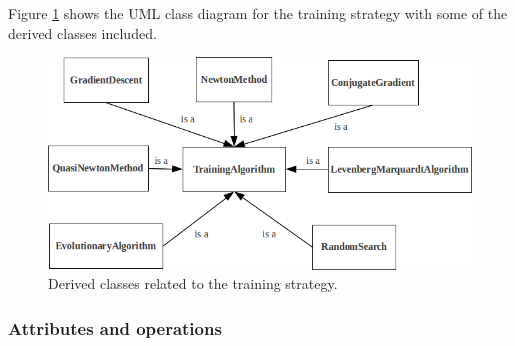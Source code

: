 Figure \ref{TrainingStrategyDerivedClassDiagram} shows the UML class diagram for the training strategy with some of the derived classes included.

\begin{figure}[h!]
\includegraphics[width=1.1\textwidth]{training_strategy/training_strategy_derived_class_diagram.png}
\caption{Derived classes related to the training strategy.}\label{TrainingStrategyDerivedClassDiagram}
\end{figure}

\subsubsection{Attributes and operations}

